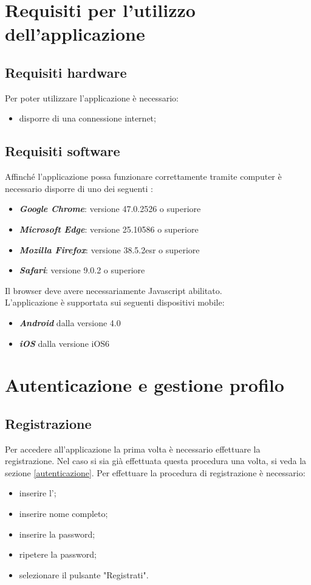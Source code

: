 \documentclass[12pt,a4paper]{article}
\begin{document}
	\newpage
	\section{Requisiti per l'utilizzo dell'applicazione} 
	\subsection{Requisiti hardware}
	Per poter utilizzare l'applicazione \prj{} è necessario:
	\begin{itemize}
		\item disporre di una connessione internet;
	\end{itemize}
	\subsection{Requisiti software}
	
	Affinché l’applicazione possa funzionare correttamente tramite computer  è necessario disporre di uno dei seguenti :
	\begin{itemize}
		\item \textit{\textbf{Google Chrome}}: versione  47.0.2526 o superiore
		\item \textit{\textbf{Microsoft Edge}}: versione 25.10586 o superiore
	\item \textit{\textbf{Mozilla Firefox}}: versione 38.5.2esr o superiore
	\item\textit{\textbf{Safari}}: versione 9.0.2 o superiore
	\end{itemize}
	Il browser deve avere necessariamente Javascript abilitato.\\
	
 L'applicazione è supportata sui seguenti dispositivi mobile:
	\begin{itemize}
	\item \textit{\textbf{Android}} dalla versione 4.0
	\item \textit{\textbf{iOS}} dalla versione iOS6
\end{itemize}

	\newpage
	\section{Autenticazione e gestione profilo}
	\subsection{Registrazione}\label{registrazione}
	Per accedere all'applicazione la prima volta è necessario effettuare la registrazione. Nel caso si sia già effettuata questa procedura una volta, si veda la sezione \ref{autenticazione}.
	Per effettuare la procedura di registrazione è necessario:
	\begin{itemize}
		\item inserire l';
		\item inserire nome completo;
		\item inserire la password;
		\item ripetere la password;
		\item selezionare il pulsante "Registrati". 
	\end{itemize}
\end{document}

